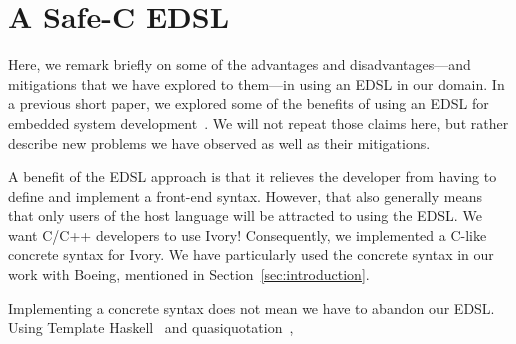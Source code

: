 \section{A Safe-C EDSL}
\label{sec:edsl}

Here, we remark briefly on some of the advantages and disadvantages---and
mitigations that we have explored to them---in using an EDSL in our domain. In a
previous short paper, we explored some of the benefits of using an EDSL for
embedded system development~\cite{smaccm}. We will not repeat those claims here,
but rather describe new problems we have observed as well as their mitigations.

A benefit of the EDSL approach is that it relieves the developer from having to
define and implement a front-end syntax. However, that also generally means that
only users of the host language will be attracted to using the
EDSL. We want C/C++ developers to use Ivory! Consequently, we implemented a
C-like concrete syntax for Ivory. We have particularly used the concrete syntax
in our work with Boeing, mentioned in Section~\ref{sec:introduction}.

Implementing a concrete syntax does not mean we have to abandon our EDSL. Using
Template Haskell~\cite{} and quasiquotation~\cite{}, 




